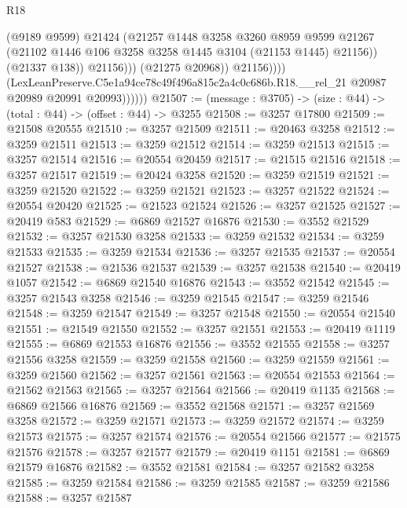 \begin{lexlean}{R18}
\begin{coremodule}
                                (@9189 @9599)
                                @21424
                                (@21257
                                  @1448
                                  @3258
                                  @3260
                                  @8959
                                  @9599
                                  @21267
                                  (@21102 @1446 @106 @3258 @3258 @1445 @3104 (@21153 @1445) @21156))
                                (@21337 @138))
                              @21156)))
                        (@21275 @20968))
                      @21156))))
              (LexLeanPreserve.C5e1a94ce78c49f496a815c2a4c0c686b.R18.__rel_21
                @20987
                @20989
                @20991
                @20993))))))
@21507 := (message : @3705) -> (size : @44) -> (total : @44) -> (offset : @44) -> @3255
@21508 := @3257 @17800
@21509 := @21508 @20555
@21510 := @3257 @21509
@21511 := @20463 @3258
@21512 := @3259 @21511
@21513 := @3259 @21512
@21514 := @3259 @21513
@21515 := @3257 @21514
@21516 := @20554 @20459
@21517 := @21515 @21516
@21518 := @3257 @21517
@21519 := @20424 @3258
@21520 := @3259 @21519
@21521 := @3259 @21520
@21522 := @3259 @21521
@21523 := @3257 @21522
@21524 := @20554 @20420
@21525 := @21523 @21524
@21526 := @3257 @21525
@21527 := @20419 @583
@21529 := @6869 @21527 @16876
@21530 := @3552 @21529
@21532 := @3257 @21530 @3258
@21533 := @3259 @21532
@21534 := @3259 @21533
@21535 := @3259 @21534
@21536 := @3257 @21535
@21537 := @20554 @21527
@21538 := @21536 @21537
@21539 := @3257 @21538
@21540 := @20419 @1057
@21542 := @6869 @21540 @16876
@21543 := @3552 @21542
@21545 := @3257 @21543 @3258
@21546 := @3259 @21545
@21547 := @3259 @21546
@21548 := @3259 @21547
@21549 := @3257 @21548
@21550 := @20554 @21540
@21551 := @21549 @21550
@21552 := @3257 @21551
@21553 := @20419 @1119
@21555 := @6869 @21553 @16876
@21556 := @3552 @21555
@21558 := @3257 @21556 @3258
@21559 := @3259 @21558
@21560 := @3259 @21559
@21561 := @3259 @21560
@21562 := @3257 @21561
@21563 := @20554 @21553
@21564 := @21562 @21563
@21565 := @3257 @21564
@21566 := @20419 @1135
@21568 := @6869 @21566 @16876
@21569 := @3552 @21568
@21571 := @3257 @21569 @3258
@21572 := @3259 @21571
@21573 := @3259 @21572
@21574 := @3259 @21573
@21575 := @3257 @21574
@21576 := @20554 @21566
@21577 := @21575 @21576
@21578 := @3257 @21577
@21579 := @20419 @1151
@21581 := @6869 @21579 @16876
@21582 := @3552 @21581
@21584 := @3257 @21582 @3258
@21585 := @3259 @21584
@21586 := @3259 @21585
@21587 := @3259 @21586
@21588 := @3257 @21587

\end{coremodule}
\end{lexlean}
